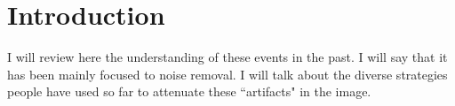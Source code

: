 \section{Introduction}

I will review here the understanding of these events in the past.
I will say that it has been mainly focused to noise removal.
I will talk about the diverse strategies people have used so far to 
attenuate these ``artifacts" in the image. 


~\cite{claerbout:467} 
~\cite{baysal:1514}
~\cite{whitmore:382} 
~\cite{guitton:S19} 
~\cite{kaelin:3125} 
~\cite{fletcher:2049} 
~\cite{sava:S209} 
~\cite{fei:3130} 
~\cite{GPR:GPR413} 
~\cite{baysal:132}
